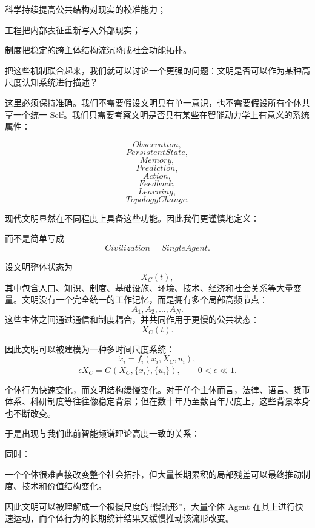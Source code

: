 科学持续提高公共结构对现实的校准能力；

工程把内部表征重新写入外部现实；

制度把稳定的跨主体结构流沉降成社会功能拓扑。

把这些机制联合起来，我们就可以讨论一个更强的问题：文明是否可以作为某种高尺度认知系统进行描述？

这里必须保持准确。我们不需要假设文明具有单一意识，也不需要假设所有个体共享一个统一 Self。我们只需要考察文明是否具有某些在智能动力学上有意义的系统属性：

\[
Observation,
\]
\[
PersistentState,
\]
\[
Memory,
\]
\[
Prediction,
\]
\[
Action,
\]
\[
Feedback,
\]
\[
Learning,
\]
\[
TopologyChange.
\]

现代文明显然在不同程度上具备这些功能。因此我们更谨慎地定义：
\begin{statementbox}
\centering
{}
\end{statementbox}
而不是简单写成
\[
Civilization=SingleAgent.
\]

设文明整体状态为
\[
X_C(t),
\]
其中包含人口、知识、制度、基础设施、环境、技术、经济和社会关系等大量变量。文明没有一个完全统一的工作记忆，而是拥有多个局部高频节点：
\[
A_1,A_2,\ldots,A_N.
\]
这些主体之间通过通信和制度耦合，并共同作用于更慢的公共状态：
\[
X_C(t).
\]

因此文明可以被建模为一种多时间尺度系统：
\[
\dot{x}_i
=
f_i(
x_i,
X_C,
u_i
),
\]
\[
\epsilon\dot{X}_C
=
G(
X_C,
\{x_i\},
\{u_i\}
),
\qquad
0<\epsilon\ll1.
\]

个体行为快速变化，而文明结构缓慢变化。对于单个主体而言，法律、语言、货币体系、科研制度等往往像稳定背景；但在数十年乃至数百年尺度上，这些背景本身也不断改变。

于是出现与我们此前智能频谱理论高度一致的关系：
\begin{statementbox}
\centering
{}
\end{statementbox}
同时：
\begin{statementbox}
\centering
{}
\end{statementbox}

一个个体很难直接改变整个社会拓扑，但大量长期累积的局部残差可以最终推动制度、技术和价值结构变化。

因此文明可以被理解成一个极慢尺度的“慢流形”，大量个体 Agent 在其上进行快速运动，而个体行为的长期统计结果又缓慢推动该流形改变。

